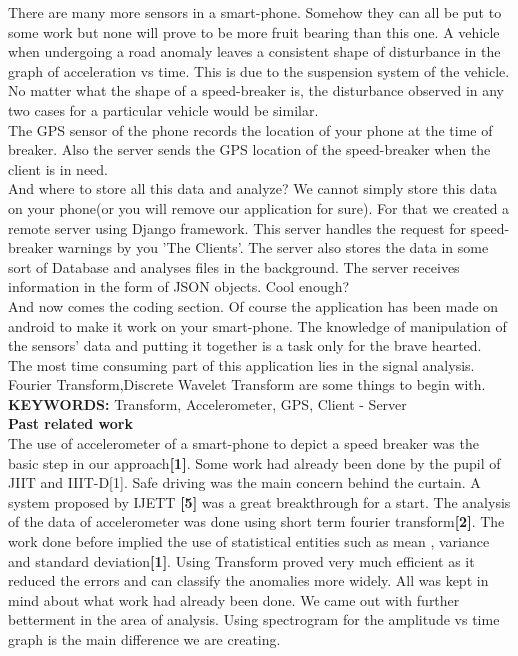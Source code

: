 \documentclass[12pt]{report}
\begin{document}
There are many more sensors in a smart-phone. Somehow they can all be put to some work but none will prove to be more fruit bearing than this one.
A vehicle when undergoing a road anomaly leaves a consistent shape of disturbance in the graph of acceleration vs time. This is due to the suspension system of the vehicle. No matter what the shape of a speed-breaker is, the disturbance observed in any two cases for a particular vehicle would be similar.\\
The GPS sensor of the phone records the location of your phone at the time of breaker. Also the server sends the GPS location of the speed-breaker when the client is in need.\\
And where to store all this data and analyze? We cannot simply store this data on your phone(or you will remove our application for sure). For that we created a remote server using Django framework. This server handles the request for speed-breaker warnings by you 'The Clients'. The server also stores the data in some sort of Database and analyses files in the background. The server receives information in the form of JSON objects.
Cool enough?\\
And now comes the coding section. Of course the application has been made on android to make it work on your smart-phone. The knowledge of manipulation of the sensors' data and putting it together is a task only for the brave hearted.\\
The most time consuming part of this application lies in the signal analysis. Fourier Transform,Discrete Wavelet Transform are some things to begin with.\\
\textbf{KEYWORDS:} Transform, Accelerometer, GPS, Client - Server  \\
\textbf{Past related work}\\
The use of accelerometer of a smart-phone to depict a speed breaker was the basic step in our approach\textbf{[1]}. Some work had already been done by the pupil of JIIT and IIIT-D[1].
Safe driving was the main concern behind the curtain. A system proposed by IJETT \textbf{[5]} was a great breakthrough for a start.
The analysis of the data of accelerometer was done using short term fourier transform\textbf{[2]}. The work done before implied the use of statistical entities such as mean , variance and standard deviation\textbf{[1]}. Using Transform proved very much efficient as it reduced the errors and can classify the anomalies more widely.
All was kept in mind about what work had already been done. We came out with further betterment in the area of analysis. Using spectrogram for the amplitude vs time graph is the main difference we are creating. 
\end{document}
